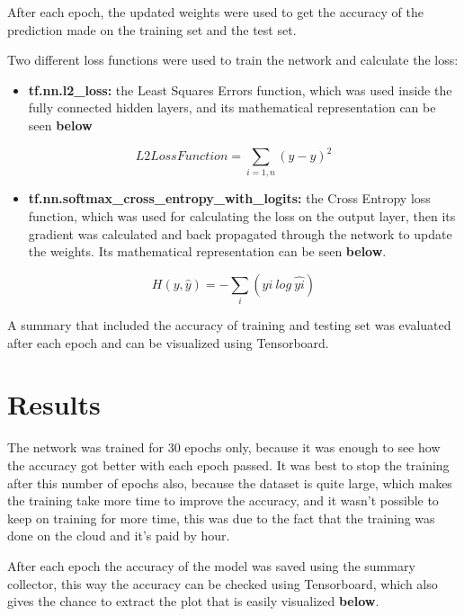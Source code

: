 \documentclass{article}
\begin{document}
After each epoch, the updated weights were used to get the accuracy of the prediction made on the training set and the test set. 

Two different loss functions were used to train the network and calculate the loss:
\newpage
\begin{itemize}
\item \textbf{tf.nn.l2\_loss:} the Least Squares Errors function, which was used inside the fully connected hidden layers, and its mathematical representation can be seen \textbf{below}
\end{itemize}

\begin{equation} 
L2LossFunction =\sum_{i=1, n}(y-\hat{y})^{2}
\end{equation} 

\begin{itemize}
\item \textbf{tf.nn.softmax\_cross\_entropy\_with\_logits:} the Cross Entropy loss function, which was used for calculating the loss on the output layer, then its gradient was calculated and back propagated through the network to update the weights. Its mathematical representation can be seen \textbf{below}.
\end{itemize}

\begin{equation} 
H(y,\hat{y})=-\sum_{ i }(yi \ log \ \hat{yi})
\end{equation} 

A summary that included the accuracy of training and testing set was evaluated after each epoch and can be visualized using Tensorboard.


\section{Results}


The network was trained for 30 epochs only, because it was enough to see how the accuracy got better with each epoch passed. It was best to stop the training after this number of epochs also, because the dataset is quite large, which makes the training take more time to improve the accuracy, and it wasn't possible to keep on training for more time, this was due to the fact that the training was done on the cloud and it's paid by hour.

After each epoch the accuracy of the model was saved using the summary collector, this way the accuracy can be checked using Tensorboard, which also gives the chance to extract the plot that is easily visualized \textbf{below}.
\end{document}
